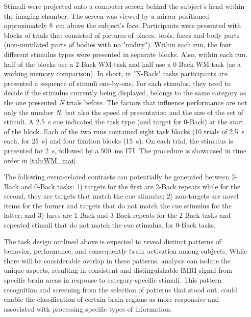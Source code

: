 \addtocounter{table}{1}
\addtocounter{figure}{-1}

Stimuli were projected onto a computer screen behind the subject's head within the imaging chamber. The screen was viewed by a mirror positioned approximately \SI{8}{\centi\meter} above the subject's face. Participants were presented with blocks of trials that consisted of pictures of places, tools, faces and body parts (non-mutilated parts of bodies with no "nudity"). Within each run, the four different stimulus types were presented in separate blocks. Also, within each run, half of the blocks use a 2-Back \gls{WM}-task and half use a 0-Back \gls{WM}-task (as a working memory comparison). In short, in "N-Back" tasks participants are presented a sequence of stimuli one-by-one. For each stimulus, they need to decide if the stimulus currently being displayed, belongs to the same category as the one presented \textit{N} trials before. The factors that influence performance are not only the number \textit{N}, but also the speed of presentation and the size of the set of stimuli. A \SI{2.5}{\second} cue indicated the task type (and target for 0-Back) at the start of the block. Each of the two runs contained eight task blocks (10 trials of \SI{2.5}{\second} each, for \SI{25}{\second}) and four fixation blocks (\SI{15}{\second}). On each trial, the stimulus is presented for \SI{2}{\second}, followed by a \SI{500}{\milli\second} \gls{ITI}. The procedure is showcased in time order in \autoref{tab:WM_mat}.

The following event-related contrasts can potentially be generated between 2-Back and 0-Back tasks: 1) targets for the first are 2-Back repeats while for the second, they are targets that match the cue stimulus; 2) non-targets are novel items for the former and targets that do not match the cue stimulus for the latter; and 3) lures are 1-Back and 3-Back repeats for the 2-Back tasks and repeated stimuli that do not match the cue stimulus, for 0-Back tasks.

The task design outlined above is expected to reveal distinct patterns of behavior, performance, and consequently brain activation among subjects. While there will be considerable overlap in these patterns, analysis can isolate the unique aspects, resulting in consistent and distinguishable \gls{fMRI} signal from specific brain areas in response to category-specific stimuli. This pattern recognition and screening from the selection of patterns that stood out, could enable the classification of certain brain regions as more responsive and associated with processing specific types of information.

